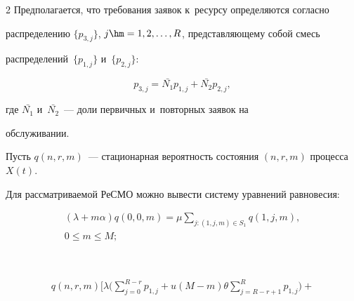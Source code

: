 \begin{multicols}{2}
Предполагается, что требования заявок к~ресурсу определяются согласно 

распределению $\{p_{3,j}\}$, $j\hm=1,2,\ldots ,R$, пред\-став\-ля\-юще\-му собой смесь 

распределений~$\{p_ {1,j}\}$ и~$\{p_{2,j}\}$:

\begin{equation*} 


    p_{3,j}=\bar{N_1} p_{1,j} + \bar{N_2} p_{2,j},

\end{equation*}







\noindent

где $\bar{N_1}$ и~$\bar{N_2}$~--- доли первичных и~по\-втор\-ных заявок на 

обслуживании.





Пусть $q(n,r,m)$~--- стационарная ве\-ро\-ят\-ность со\-сто\-яния $(n,r,m)$ процесса~$X(t)$. 

Для рассматриваемой РеСМО мож\-но вывести сис\-те\-му уравнений рав\-но\-ве\-сия:

\begin{multline}

 (\lambda + m\alpha)q(0,0,m)=\mu \!\!\!\! \sum\limits_{j: (1,j,m) \in S_1} \!\!\!\!\!\! q\left(1,j,m\right), \\

  0  \leq m \leq M; 

  \label{eqn:sur}

\end{multline}



\vspace*{-15pt}

\columnbreak

\



\vspace*{-18pt}



\noindent

\begin{multline}

q(n,r,m) \Bigg[ \lambda \Bigg( \sum\limits_{j=0}^{R-r} p_{1,j} + u(M-m) \theta 

\!\! \!\sum\limits_{j=R-r+1}^R \!\!\!\! p_{1,j} \Bigg) +{}\\


\end{multline}
\end{multicols}
